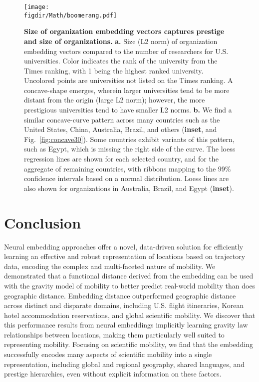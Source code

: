 \documentclass[12pt]{article} %
\def\figdir{../Figs}
\begin{document}
%
%
\begin{figure}[h!]
	\centering
	\texttt{[image: \\figdir/Math/boomerang.pdf]}
	\caption{
		\textbf{Size of organization embedding vectors captures prestige and size of organizations.}
		\textbf{a.} Size (L2 norm) of organization embedding vectors compared to the number of researchers for U.S. universities.
		Color indicates the rank of the university from the Times ranking, with 1 being the highest ranked university.
		Uncolored points are universities not listed on the Times ranking.
		A concave-shape emerges, wherein larger universities tend to be more distant from the origin (large L2 norm); however, the more prestigious universities tend to have smaller L2 norms.
		\textbf{b.} We find a similar concave-curve pattern across many countries such as the United States, China, Australia, Brazil, and others (\textbf{inset}, and Fig.~\ref{fig:concave30}).
		Some countries exhibit variants of this pattern, such as Egypt, which is missing the right side of the curve.
		The loess regression lines are shown for each selected country, and for the aggregate of remaining countries, with ribbons mapping to the 99\% confidence intervals based on a normal distribution.
		Loess lines are also shown for organizations in Australia, Brazil, and Egypt (\textbf{inset}).
	}
	\label{fig:length}
\end{figure}


%
%
\section*{Conclusion}

Neural embedding approaches offer a novel, data-driven solution for efficiently learning an effective and robust representation of locations based on trajectory data, encoding the complex and multi-faceted nature of mobility.
We demonstrated that a functional distance derived from the embedding can be used with the gravity model of mobility to better predict real-world mobility than does geographic distance.
Embedding distance outperformed geographic distance across distinct and disparate domains, including U.S. flight itineraries, Korean hotel accommodation reservations, and global scientific mobility.
We discover that this performance results from neural embeddings implicitly learning gravity law relationships between locations, making them particularly well suited to representing mobility.
Focusing on scientific mobility, we find that the embedding successfully encodes many aspects of scientific mobility into a single representation, including global and regional geography, shared languages, and prestige hierarchies, even without explicit information on these factors.
\end{document}
